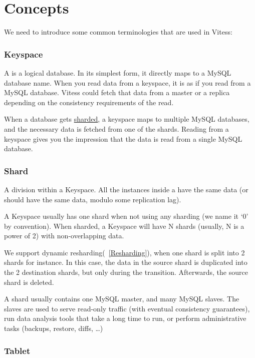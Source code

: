 \section{Concepts}\label{Concepts}

We need to introduce some common terminologies that are used in Vitess:
\subsubsection{Keyspace}\label{Keyspace}
A  is a logical database.
In its simplest form, it directly maps to a MySQL database name.
When you read data from a keyspace, it is as if you read from a MySQL database.
Vitess could fetch that data from a master or a replica depending
on the consistency requirements of the read.

When a database gets \href{http://en.wikipedia.org/wiki/Shard\_(database\_architecture)}{sharded}, a keyspace maps to multiple MySQL databases,
and the necessary data is fetched from one of the shards.
Reading from a keyspace gives you the impression that the data is read from
a single MySQL database.

\subsubsection{Shard}\label{shard}

A division within a Keyspace. All the instances inside a  have the same data (or should have the same data,
modulo some replication lag).

A Keyspace usually has one shard when not using any sharding (we name it `0' by convention). When sharded, a Keyspace will have N shards (usually, N is a power of 2) with non-overlapping data.

We support dynamic resharding(~\ref{Resharding}), when one shard is split into 2 shards for instance. In this case, the data in the
source shard is duplicated into the 2 destination shards, but only during the transition. Afterwards, the source shard is
deleted.

A shard usually contains one MySQL master, and many MySQL slaves. The slaves are used to serve read-only traffic (with
eventual consistency guarantees), run data analysis tools that take a long time to run, or perform administrative tasks (backups, restore, diffs, \ldots{})

\subsubsection{Tablet}\hypertarget{tablet}{}\label{tablet}

